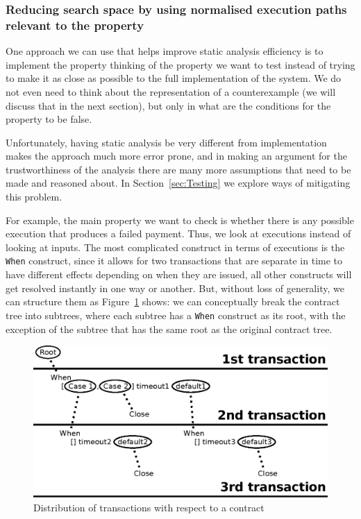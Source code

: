 \documentclass[english,runningheads]{llncs}
\begin{document}
\subsubsection{Reducing search space by using normalised execution paths relevant
to the property \label{subsec:Reducing-search-space-by-using-normalised-execution-paths-relevant-to-the-property}}

One approach we can use that helps improve static analysis efficiency
is to implement the property thinking of the property we want to test
instead of trying to make it as close as possible to the full implementation
of the system. We do not even need to think about the representation
of a counterexample (we will discuss that in the next section), but
only in what are the conditions for the property to be false.

Unfortunately, having static analysis be very different from implementation
makes the approach much more error prone, and in making an argument
for the trustworthiness of the analysis there are many more assumptions
that need to be made and reasoned about. In Section~\ref{sec:Testing}
we explore ways of mitigating this problem.

For example, the main property we want to check is whether there is
any possible execution that produces a failed payment. Thus, we look
at executions instead of looking at inputs. The most complicated construct
in terms of executions is the \texttt{When} construct, since it allows
for two transactions that are separate in time to have different effects
depending on when they are issued, all other constructs will get resolved
instantly in one way or another. But, without loss of generality,
we can structure them as Figure~\ref{fig:Distribution-of-transactions}
shows: we can conceptually break the contract tree into subtrees,
where each subtree has a \texttt{When} construct as its root, with
the exception of the subtree that has the same root as the original
contract tree.

\begin{figure}
\includegraphics[width=1\textwidth]{figures/transactions}

\caption{Distribution of transactions with respect to a contract\label{fig:Distribution-of-transactions}}

\end{figure}
\end{document}
